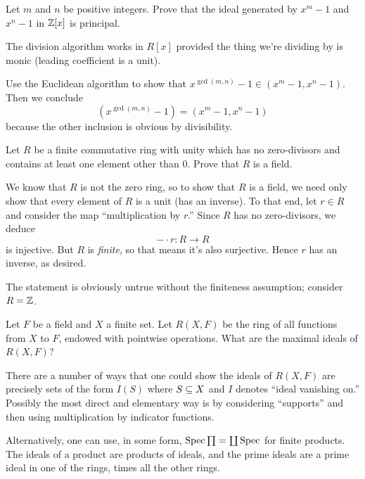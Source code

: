 \begin{problem}
	Let $m$ and $n$ be positive integers. Prove that the ideal generated by $x^m - 1$ and $x^n - 1$ in $\mathbb{Z}[x]$ is principal.
\end{problem}
\begin{rem*}
	The division algorithm works in $R[x]$ provided the thing we're dividing by is monic (leading coefficient is a unit).
\end{rem*}
\begin{solution}
	Use the Euclidean algorithm to show that $x^{\gcd(m,n)} - 1 \in (x^m-1, x^n -1)$. Then we conclude
	\[
		(x^{\gcd(m,n)}-1) = (x^m-1, x^n-1)
	\]
	because the other inclusion is obvious by divisibility.
\end{solution}

\begin{problem}
	Let $R$ be a finite commutative ring with unity which has no zero-divisors and contains at least one element other than $0$. Prove that $R$ is a field.
\end{problem}
\begin{solution}
	We know that $R$ is not the zero ring, so to show that $R$ is a field, we need only show that every element of $R$ is a unit (has an inverse). To that end, let $r\in R$ and consider the map ``multiplication by $r$.'' Since $R$ has no zero-divisors, we deduce
	\[
		-\cdot r \colon R\to R
	\]
	is injective. But $R$ is \emph{finite}, so that means it's also surjective. Hence $r$ has an inverse, as desired.
	
	The statement is obviously untrue without the finiteness assumption; consider $R = \mathbb{Z}$.
\end{solution}

\begin{problem}
	Let $F$ be a field and $X$ a finite set. Let $R(X,F)$ be the ring of all functions from $X$ to $F$, endowed with pointwise operations. What are the maximal ideals of $R(X,F)$?
\end{problem}
\begin{solution}
	There are a number of ways that one could show the ideals of $R(X,F)$ are precisely sets of the form $I(S)$ where $S\subseteq X$ and $I$ denotes ``ideal vanishing on.'' Possibly the most direct and elementary way is by considering ``supports'' and then using multiplication by indicator functions.
	
	Alternatively, one can use, in some form, $\operatorname{Spec} \prod = \coprod \operatorname{Spec}$ for finite products. The ideals of a product are products of ideals, and the prime ideals are a prime ideal in one of the rings, times all the other rings.
\end{solution}

